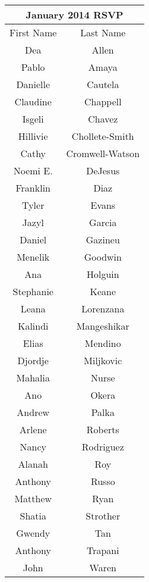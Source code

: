 \documentclass[12pt,dvipsnames]{article}
\begin{document}
\begin{table}
	\begin{tabular}{|c|c|}
			\multicolumn{2}{c}{\bfseries January 2014 RSVP}\\\hline
		First Name & Last Name\\ 
		\hline
		Dea & Allen\\ 
\hline
Pablo & Amaya\\ 
\hline
Danielle & Cautela\\ 
\hline
Claudine  & Chappell\\ 
\hline
Isgeli & Chavez\\ 
\hline
Hillivie & Chollete-Smith\\ 
\hline
Cathy & Cromwell-Watson\\ 
\hline
Noemi E.  & DeJesus\\ 
\hline
Franklin & Diaz\\ 
\hline
Tyler  & Evans\\ 
\hline
Jazyl & Garcia\\ 
\hline
Daniel  & Gazineu\\ 
\hline
Menelik  & Goodwin\\ 
\hline
Ana & Holguin\\ 
\hline
Stephanie & Keane\\ 
\hline
Leana & Lorenzana\\ 
\hline
Kalindi & Mangeshikar\\ 
\hline
Elias & Mendino\\ 
\hline
Djordje & Miljkovic\\ 
\hline
Mahalia & Nurse\\ 
\hline
Ano  & Okera\\ 
\hline
Andrew  & Palka\\ 
\hline
Arlene & Roberts\\ 
\hline
Nancy & Rodriguez\\ 
\hline
Alanah & Roy\\ 
\hline
Anthony & Russo\\ 
\hline
Matthew  & Ryan\\ 
\hline
Shatia & Strother\\ 
\hline
Gwendy & Tan\\ 
\hline
Anthony  & Trapani\\ 
\hline
John & Waren\\  
		\hline\end{tabular}
 \hfill
%	
\end{table}
\end{document}
